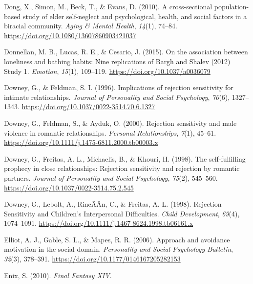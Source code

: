 \documentclass[
]{udthesis}
\newlength{\cslhangindent}
\newenvironment{CSLReferences}[2] %
 {\begin{list}{}{%
  \setlength{\itemindent}{0pt}
  \setlength{\leftmargin}{0pt}
  \setlength{\parsep}{0pt}
  \ifodd #1
   \setlength{\leftmargin}{\cslhangindent}
   \setlength{\itemindent}{-1\cslhangindent}
  \fi
  \setlength{\itemsep}{#2\baselineskip}}}
 {\end{list}}
\begin{document}
\begin{CSLReferences}{1}{0}
Dong, X., Simon, M., Beck, T., \& Evans, D. (2010). A cross-sectional population-based study of elder self-neglect and psychological, health, and social factors in a biracial community. \emph{Aging \& Mental Health}, \emph{14}(1), 74--84. \url{https://doi.org/10.1080/13607860903421037}

Donnellan, M. B., Lucas, R. E., \& Cesario, J. (2015). On the association between loneliness and bathing habits: Nine replications of {Bargh} and {Shalev} (2012) {Study} 1. \emph{Emotion}, \emph{15}(1), 109--119. \url{https://doi.org/10.1037/a0036079}

Downey, G., \& Feldman, S. I. (1996). Implications of rejection sensitivity for intimate relationships. \emph{Journal of Personality and Social Psychology}, \emph{70}(6), 1327--1343. \url{https://doi.org/10.1037/0022-3514.70.6.1327}

Downey, G., Feldman, S., \& Ayduk, O. (2000). Rejection sensitivity and male violence in romantic relationships. \emph{Personal Relationships}, \emph{7}(1), 45--61. \url{https://doi.org/10.1111/j.1475-6811.2000.tb00003.x}

Downey, G., Freitas, A. L., Michaelis, B., \& Khouri, H. (1998). The self-fulfilling prophecy in close relationships: {Rejection} sensitivity and rejection by romantic partners. \emph{Journal of Personality and Social Psychology}, \emph{75}(2), 545--560. \url{https://doi.org/10.1037/0022-3514.75.2.545}

Downey, G., Lebolt, A., RincÃÂn, C., \& Freitas, A. L. (1998). Rejection {Sensitivity} and {Children}'s {Interpersonal Difficulties}. \emph{Child Development}, \emph{69}(4), 1074--1091. \url{https://doi.org/10.1111/j.1467-8624.1998.tb06161.x}

Elliot, A. J., Gable, S. L., \& Mapes, R. R. (2006). Approach and avoidance motivation in the social domain. \emph{Personality and Social Psychology Bulletin}, \emph{32}(3), 378--391. \url{https://doi.org/10.1177/0146167205282153}

Enix, S. (2010). \emph{Final Fantasy XIV}.


\end{CSLReferences}
\end{document}
